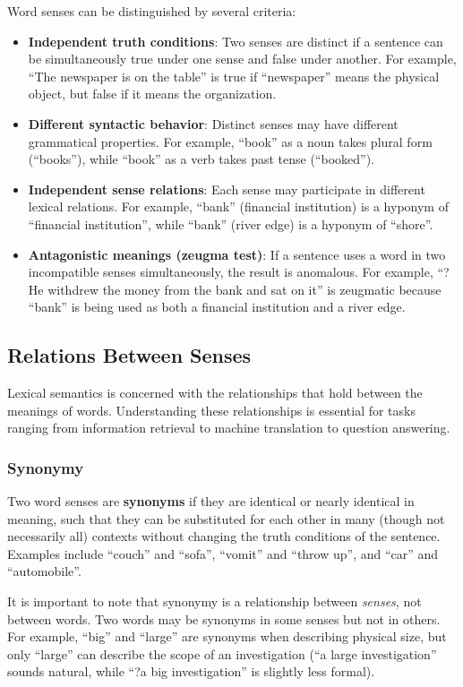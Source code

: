 \documentclass[11pt,a4paper]{article}
\begin{document}
Word senses can be distinguished by several criteria:
\begin{itemize}
    \item \textbf{Independent truth conditions}: Two senses are distinct if a sentence can be simultaneously true under one sense and false under another. For example, ``The newspaper is on the table'' is true if ``newspaper'' means the physical object, but false if it means the organization.
    \item \textbf{Different syntactic behavior}: Distinct senses may have different grammatical properties. For example, ``book'' as a noun takes plural form (``books''), while ``book'' as a verb takes past tense (``booked'').
    \item \textbf{Independent sense relations}: Each sense may participate in different lexical relations. For example, ``bank'' (financial institution) is a hyponym of ``financial institution'', while ``bank'' (river edge) is a hyponym of ``shore''.
    \item \textbf{Antagonistic meanings (zeugma test)}: If a sentence uses a word in two incompatible senses simultaneously, the result is anomalous. For example, ``?He withdrew the money from the bank and sat on it'' is zeugmatic because ``bank'' is being used as both a financial institution and a river edge.
\end{itemize}

\subsection{Relations Between Senses}

Lexical semantics is concerned with the relationships that hold between the meanings of words. Understanding these relationships is essential for tasks ranging from information retrieval to machine translation to question answering.

\subsubsection{Synonymy}

Two word senses are \textbf{synonyms} if they are identical or nearly identical in meaning, such that they can be substituted for each other in many (though not necessarily all) contexts without changing the truth conditions of the sentence. Examples include ``couch'' and ``sofa'', ``vomit'' and ``throw up'', and ``car'' and ``automobile''.

It is important to note that synonymy is a relationship between \textit{senses}, not between words. Two words may be synonyms in some senses but not in others. For example, ``big'' and ``large'' are synonyms when describing physical size, but only ``large'' can describe the scope of an investigation (``a large investigation'' sounds natural, while ``?a big investigation'' is slightly less formal).
\end{document}
